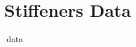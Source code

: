 \chapter{Stiffeners Data}
\label{ch:stiffeners_data}
\newpage
\thispagestyle{lscape}
\pagestyle{lscape}
\begin{landscape}
    ^^^data
\end{landscape}
\thispagestyle{normal}
\pagestyle{normal}